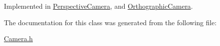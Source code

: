 Implemented in \hyperlink{classPerspectiveCamera_a3a82bc5e9f2fd72faaaf42b3919ecf8a}{Perspective\+Camera}, and \hyperlink{classOrthographicCamera_a8e94c85d863b6e822c6dc41dd6c8c48d}{Orthographic\+Camera}.



The documentation for this class was generated from the following file\+:\begin{DoxyCompactItemize}
\item 
\hyperlink{Camera_8h}{Camera.\+h}\end{DoxyCompactItemize}
